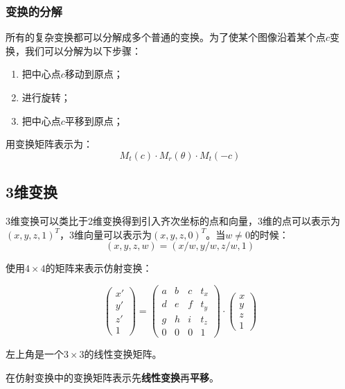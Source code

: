 \documentclass[openany]{progbookcn}
\begin{document}
\subsubsection{变换的分解}

所有的复杂变换都可以分解成多个普通的变换。为了使某个图像沿着某个点$c$变换，我们可以分解为以下步骤：

\begin{enumerate}
	\item 把中心点$c$移动到原点；
	\item 进行旋转；
	\item 把中心点$c$平移到原点；
\end{enumerate}

用变换矩阵表示为：
\begin{equation}
	M_{t}(c)\cdot M_{r}(\theta) \cdot M_{t}(-c)
\end{equation}

\subsection{3维变换}

3维变换可以类比于2维变换得到引入齐次坐标的点和向量，3维的点可以表示为$(x,y,z,1)^T$，3维向量可以表示为$(x,y,z,0)^T$。当$w\ne 0$的时候：
\begin{equation}
	(x,y,z,w)=(x/w,y/w,z/w,1)
\end{equation}

使用$4\times 4$的矩阵来表示仿射变换：

\begin{equation}
	\begin{pmatrix}x'\\y'\\z'\\1\end{pmatrix}=\begin{pmatrix}a&b&c&t_x\\d&e&f&t_y\\g&h&i&t_z\\0&0&0&1\end{pmatrix}\cdot\begin{pmatrix}x\\y\\z\\1\end{pmatrix}
\end{equation}

左上角是一个$3\times 3$的线性变换矩阵。

在仿射变换中的变换矩阵表示先\textbf{线性变换}再\textbf{平移}。
\end{document}
